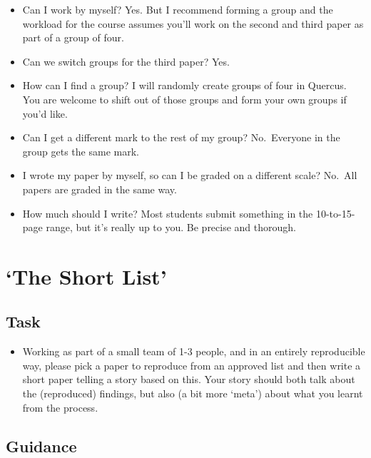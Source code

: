 \documentclass[
]{book}
\providecommand{\tightlist}{%
  \setlength{\itemsep}{0pt}\setlength{\parskip}{0pt}}
\begin{document}
\begin{itemize}
\tightlist
\item
  Can I work by myself? Yes. But I recommend forming a group and the workload for the course assumes you'll work on the second and third paper as part of a group of four.
\item
  Can we switch groups for the third paper? Yes.
\item
  How can I find a group? I will randomly create groups of four in Quercus. You are welcome to shift out of those groups and form your own groups if you'd like.
\item
  Can I get a different mark to the rest of my group? No.~Everyone in the group gets the same mark.
\item
  I wrote my paper by myself, so can I be graded on a different scale? No.~All papers are graded in the same way.
\item
  How much should I write? Most students submit something in the 10-to-15-page range, but it's really up to you. Be precise and thorough.
\end{itemize}

\hypertarget{the-short-list}{%
\section{`The Short List'}\label{the-short-list}}

\hypertarget{task-2}{%
\subsection{Task}\label{task-2}}

\begin{itemize}
\tightlist
\item
  Working as part of a small team of 1-3 people, and in an entirely reproducible way, please pick a paper to reproduce from an approved list and then write a short paper telling a story based on this. Your story should both talk about the (reproduced) findings, but also (a bit more `meta') about what you learnt from the process.
\end{itemize}

\hypertarget{guidance-2}{%
\subsection{Guidance}\label{guidance-2}}
\end{document}
